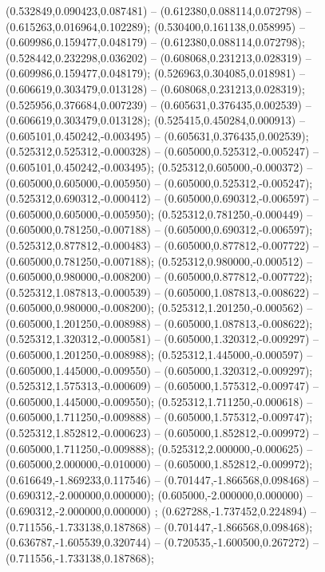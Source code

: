  (0.532849,0.090423,0.087481) -- (0.612380,0.088114,0.072798) -- (0.615263,0.016964,0.102289);
 (0.530400,0.161138,0.058995) -- (0.609986,0.159477,0.048179) -- (0.612380,0.088114,0.072798);
 (0.528442,0.232298,0.036202) -- (0.608068,0.231213,0.028319) -- (0.609986,0.159477,0.048179);
 (0.526963,0.304085,0.018981) -- (0.606619,0.303479,0.013128) -- (0.608068,0.231213,0.028319);
 (0.525956,0.376684,0.007239) -- (0.605631,0.376435,0.002539) -- (0.606619,0.303479,0.013128);
 (0.525415,0.450284,0.000913) -- (0.605101,0.450242,-0.003495) -- (0.605631,0.376435,0.002539);
 (0.525312,0.525312,-0.000328) -- (0.605000,0.525312,-0.005247) -- (0.605101,0.450242,-0.003495);
 (0.525312,0.605000,-0.000372) -- (0.605000,0.605000,-0.005950) -- (0.605000,0.525312,-0.005247);
 (0.525312,0.690312,-0.000412) -- (0.605000,0.690312,-0.006597) -- (0.605000,0.605000,-0.005950);
 (0.525312,0.781250,-0.000449) -- (0.605000,0.781250,-0.007188) -- (0.605000,0.690312,-0.006597);
 (0.525312,0.877812,-0.000483) -- (0.605000,0.877812,-0.007722) -- (0.605000,0.781250,-0.007188);
 (0.525312,0.980000,-0.000512) -- (0.605000,0.980000,-0.008200) -- (0.605000,0.877812,-0.007722);
 (0.525312,1.087813,-0.000539) -- (0.605000,1.087813,-0.008622) -- (0.605000,0.980000,-0.008200);
 (0.525312,1.201250,-0.000562) -- (0.605000,1.201250,-0.008988) -- (0.605000,1.087813,-0.008622);
 (0.525312,1.320312,-0.000581) -- (0.605000,1.320312,-0.009297) -- (0.605000,1.201250,-0.008988);
 (0.525312,1.445000,-0.000597) -- (0.605000,1.445000,-0.009550) -- (0.605000,1.320312,-0.009297);
 (0.525312,1.575313,-0.000609) -- (0.605000,1.575312,-0.009747) -- (0.605000,1.445000,-0.009550);
 (0.525312,1.711250,-0.000618) -- (0.605000,1.711250,-0.009888) -- (0.605000,1.575312,-0.009747);
 (0.525312,1.852812,-0.000623) -- (0.605000,1.852812,-0.009972) -- (0.605000,1.711250,-0.009888);
 (0.525312,2.000000,-0.000625) -- (0.605000,2.000000,-0.010000) -- (0.605000,1.852812,-0.009972);
 (0.616649,-1.869233,0.117546) -- (0.701447,-1.866568,0.098468) -- (0.690312,-2.000000,0.000000);
 (0.605000,-2.000000,0.000000) -- (0.690312,-2.000000,0.000000) ;
 (0.627288,-1.737452,0.224894) -- (0.711556,-1.733138,0.187868) -- (0.701447,-1.866568,0.098468);
 (0.636787,-1.605539,0.320744) -- (0.720535,-1.600500,0.267272) -- (0.711556,-1.733138,0.187868);
